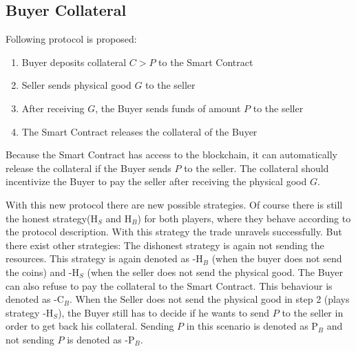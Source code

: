 \documentclass{cacthesis}
\begin{document}
\subsection{Buyer Collateral}
Following protocol is proposed:
\begin{enumerate}
    \item Buyer deposits collateral $C > P$ to the Smart Contract
    \item Seller sends physical good $G$ to the seller 
    \item After receiving $G$, the Buyer sends funds of amount $P$ to the seller 
    \item The Smart Contract releases the collateral of the Buyer
\end{enumerate}

Because the Smart Contract has access to the blockchain, it can automatically release the collateral if the Buyer sends $P$  to the seller. The collateral should incentivize the Buyer to pay the seller after receiving the physical good $G$.

With this new protocol there are new possible strategies. Of course there is still the honest strategy(H$_S$ and H$_B$) for both players, where they behave according to the protocol description. With this strategy the trade unravels successfully.\newline
But there exist other strategies: The dishonest strategy is again not sending the resources. This strategy is again denoted as -H$_B$ (when the buyer does not send the coins) and -H$_S$ (when the seller does not send the physical good.\newline
The Buyer can also refuse to pay the collateral to the Smart Contract. This behaviour is denoted as -C$_B$.\newline
When the Seller does not send the physical good in step 2 (plays strategy -H$_S$), the Buyer still has to decide if he wants to send $P$ to the seller in order to get back his collateral. Sending $P$ in this scenario is denoted as P$_B$ and not sending $P$ is denoted as -P$_B$.\newline

\end{document}
